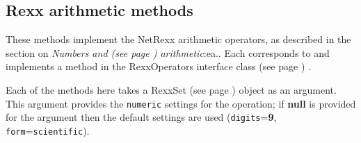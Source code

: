 \subsection{Rexx arithmetic methods}\label{"id"}
 These methods implement the NetRexx arithmetic operators, as
described in the section on  \emph{Numbers and (see page \pageref{refnums}) 
arithmetic}:ea..
Each corresponds to and implements a
method in the  RexxOperators interface class (see page \pageref{refnlrops}) .
 
Each of the methods here takes a  RexxSet (see page \pageref{refnlrset})  object as
an argument.  This argument provides the \texttt{numeric} settings for
the operation; if \textbf{null} is provided for the argument then the
default settings are used (\texttt{digits}=\textbf{9},
\texttt{form}=\texttt{scientific}).
 

